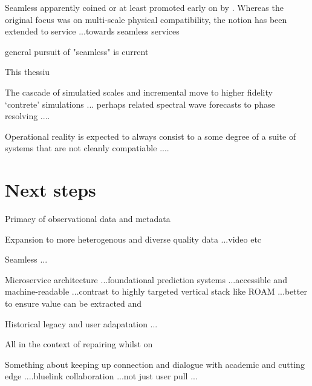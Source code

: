 Seamless apparently coined or at least promoted early on by \citet{10.1175/bams-89-4-459}.
Whereas the original focus was on multi-scale physical compatibility, the notion has been extended to service ...towards seamless services \cite{BOM2020}

general pursuit of "seamless" is current \cite{10.1127/metz/2020/1048}



This thessiu 

The cascade of simulatied scales and incremental move to higher fidelity `contrete' simulations  ...
perhaps related spectral wave forecasts to phase resolving ....


Operational reality is expected to always consist to a some degree of a suite of systems that are not cleanly compatiable ....



\section{Next steps}

Primacy of observational data and metadata

Expansion to more heterogenous and diverse quality data ...video etc


Seamless ...

Microservice architecture 
...foundational prediction systems 
...accessible and machine-readable 
...contrast to highly targeted vertical stack like ROAM   ...better to ensure value can be extracted and 

Historical legacy and user adapatation ...

All in the context of repairing whilst on 

Something about keeping up connection and dialogue with academic and cutting edge ....bluelink collaboration ...not just user pull ...



